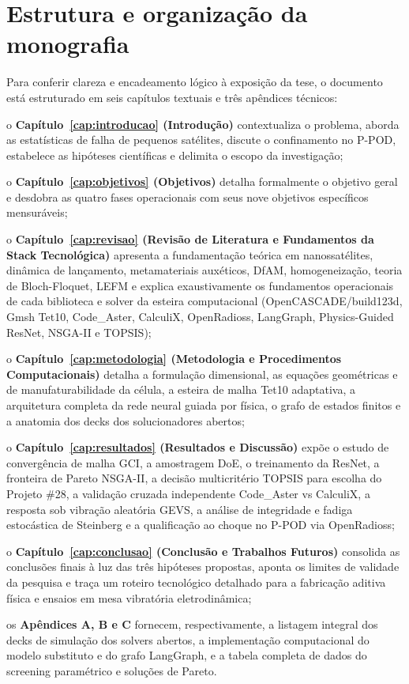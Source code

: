 \section{Estrutura e organização da monografia}
\label{sec:intro-organizacao}

Para conferir clareza e encadeamento lógico à exposição da tese, o documento está estruturado em seis capítulos textuais e três apêndices técnicos:
\begin{alineas}
  \item o \textbf{Capítulo~\ref{cap:introducao} (Introdução)} contextualiza o problema, aborda as estatísticas de falha de pequenos satélites, discute o confinamento no P-POD, estabelece as hipóteses científicas e delimita o escopo da investigação;
  \item o \textbf{Capítulo~\ref{cap:objetivos} (Objetivos)} detalha formalmente o objetivo geral e desdobra as quatro fases operacionais com seus nove objetivos específicos mensuráveis;
  \item o \textbf{Capítulo~\ref{cap:revisao} (Revisão de Literatura e Fundamentos da Stack Tecnológica)} apresenta a fundamentação teórica em nanossatélites, dinâmica de lançamento, metamateriais auxéticos, DfAM, homogeneização, teoria de Bloch-Floquet, LEFM e explica exaustivamente os fundamentos operacionais de cada biblioteca e solver da esteira computacional (OpenCASCADE/build123d, Gmsh Tet10, Code\_Aster, CalculiX, OpenRadioss, LangGraph, Physics-Guided ResNet, NSGA-II e TOPSIS);
  \item o \textbf{Capítulo~\ref{cap:metodologia} (Metodologia e Procedimentos Computacionais)} detalha a formulação dimensional, as equações geométricas e de manufaturabilidade da célula, a esteira de malha Tet10 adaptativa, a arquitetura completa da rede neural guiada por física, o grafo de estados finitos e a anatomia dos decks dos solucionadores abertos;
  \item o \textbf{Capítulo~\ref{cap:resultados} (Resultados e Discussão)} expõe o estudo de convergência de malha GCI, a amostragem DoE, o treinamento da ResNet, a fronteira de Pareto NSGA-II, a decisão multicritério TOPSIS para escolha do Projeto \#28, a validação cruzada independente Code\_Aster vs CalculiX, a resposta sob vibração aleatória GEVS, a análise de integridade e fadiga estocástica de Steinberg e a qualificação ao choque no P-POD via OpenRadioss;
  \item o \textbf{Capítulo~\ref{cap:conclusao} (Conclusão e Trabalhos Futuros)} consolida as conclusões finais à luz das três hipóteses propostas, aponta os limites de validade da pesquisa e traça um roteiro tecnológico detalhado para a fabricação aditiva física e ensaios em mesa vibratória eletrodinâmica;
  \item os \textbf{Apêndices A, B e C} fornecem, respectivamente, a listagem integral dos decks de simulação dos solvers abertos, a implementação computacional do modelo substituto e do grafo LangGraph, e a tabela completa de dados do screening paramétrico e soluções de Pareto.
\end{alineas}
